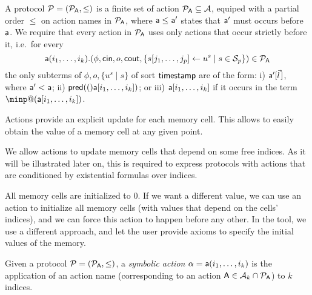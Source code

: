 \begin{definition} \label{def:proto}
  A protocol $\mathcal{P} = (\mathcal{P}_{\textsf{A}}, \leq)$ is a finite set of action $\mathcal{P}_{\textsf{A}} \subseteq \mathcal{A}$, equiped with a partial order $\leq$ on action names in $\mathcal{P}_{\textsf{A}}$, where $\textsf{a} \leq \textsf{a}'$ states that $\textsf{a}'$ must occurs before $\textsf{a}$. %
  We require that every action in $\mathcal{P}_{\textsf{A}}$ uses only actions that occur strictly before it, i.e.\ for every
  \[
    \textsf{a}(i_1,\dots,i_k).(\phi, \mathsf{cin}, o, \mathsf{cout},
    \{s[j_1,\dots, j_p] \leftarrow u^{s} \mid s \in \mathcal{S}_{p}\})
    \in \mathcal{P}_{\textsf{A}}
  \]
  the only subterms of $\phi, o, \{u^{s}\mid s\}$ of sort $\textsf{timestamp}$ are of the form: i) $\sfa'[\pvec{l}]$, where $\textsf{a}' < \textsf{a}$; ii) $\textsf{pred}(()\textsf{a}[i_1,\dots,i_k])$; or iii) $\textsf{a}[i_1,\dots,i_k]$ if it occurs in the term $\minp@(\sfa[i_1,\dots,i_k])$.
\end{definition}


\begin{remark}
  Actions provide an explicit update for each memory cell. This
  allows to easily obtain the value of a memory cell at any given point.

  We allow actions to update memory cells that depend on some free indices.  As
  it will be illustrated later on, this is required to express protocols with
  actions that are conditioned by existential formulas over indices.

  All memory cells are initialized to $0$. If we want a different value, we can use an action to initialize all memory cells (with values that depend on the cells'
  indices), and we can force this action to happen before any other.
  In the tool, we use a different approach, and let the user provide axioms to specify the initial values of the memory.
\end{remark}

\begin{definition}
  Given a protocol $\mathcal{P} = (\mathcal{P}_{\textsf{A}}, \leq)$, a \emph{symbolic action} $\alpha = \textsf{a}(i_1,\ldots,i_k)$ is the application of an action name (corresponding to an action $\textsf{A} \in \mathcal{A}_k \cap \mathcal{P}_{\textsf{A}}$) to $k$ indices.
\end{definition}

